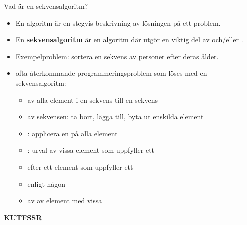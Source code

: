 \begin{Slide}{Vad är en sekvensalgoritm?}\SlideFontTiny
\begin{itemize}
\item En algoritm är en stegvis beskrivning av lösningen på ett problem.
\item En \textbf{sekvensalgoritm} är en algoritm där  utgör en viktig del av  och/eller .
\item Exempelproblem: sortera en sekvens av personer efter deras ålder.
\pause
\item {} ofta återkommande programmeringsproblem som löses med en sekvensalgoritm:
\begin{itemize}\SlideFontTiny
\item {} av alla element i en sekvens till en  sekvens
\item {} av sekvensen: ta bort, lägga till, byta ut enskilda element
\item {}: applicera en  på alla element   
\item {}: urval av vissa element som uppfyller ett 
\item {} efter ett element som uppfyller ett 
\item {} enligt någon 
\item {} av  av element med vissa 
\end{itemize}
\end{itemize}
\href{https://youtu.be/0ArlUSVDQIw?t=27s}{\textbf{KUTFSSR}} 
\end{Slide}



